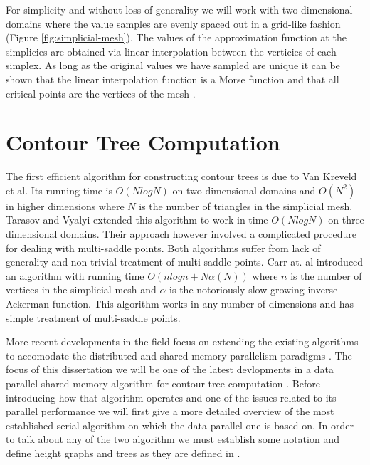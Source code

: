 For simplicity and without loss of generality we will work with two-dimensional domains where the value samples are evenly spaced out in a grid-like fashion (Figure \ref{fig:simplicial-mesh}). The values of the approximation function at the simplicies are obtained via linear interpolation between the verticies of each simplex. As long as the original values we have sampled are unique it can be shown that the linear interpolation function is a Morse function and that all critical points are the vertices of the mesh \cite{curvature-embeded-polyhedra}.

\section{Contour Tree Computation}



The first efficient algorithm for constructing contour trees \cite{first-ct-algo} is due to Van Kreveld et al. Its running time is $O(NlogN)$ on two dimensional domains and $O(N^2)$ in higher dimensions where $N$ is the number of triangles in the simplicial mesh. Tarasov and Vyalyi \cite{second-ct-algo} extended this algorithm to work in time $O(NlogN)$ on three dimensional domains. Their approach however involved a complicated procedure for dealing with multi-saddle points. Both algorithms suffer from lack of generality and non-trivial treatment of multi-saddle points. Carr at. al \cite{ct-big-paper} introduced an algorithm with running time $O(nlogn + N\alpha(N))$ where $n$ is the number of vertices in the simplicial mesh and $\alpha$ is the notoriously slow growing inverse Ackerman function. This algorithm works in any number of dimensions and has simple treatment of multi-saddle points.

More recent developments in the field focus on extending the existing algorithms to accomodate the distributed \cite{distributed-ct-algo, distributed-ct-algo-2} and shared memory parallelism paradigms \cite{parallel-peak-pruning, parallel-ct-1}. The focus of this dissertation we will be one of the latest devlopments in a data parallel shared memory algorithm for contour tree computation
\cite{parallel-peak-pruning}. Before introducing how that algorithm operates and one of the issues related to its parallel performance we will first give a more detailed overview of the most established serial algorithm \cite{ct-big-paper} on which the data parallel one is based on. In order to talk about any of the two algorithm we must establish some notation and define height graphs and trees as they are defined in \cite{carr-masters}.


